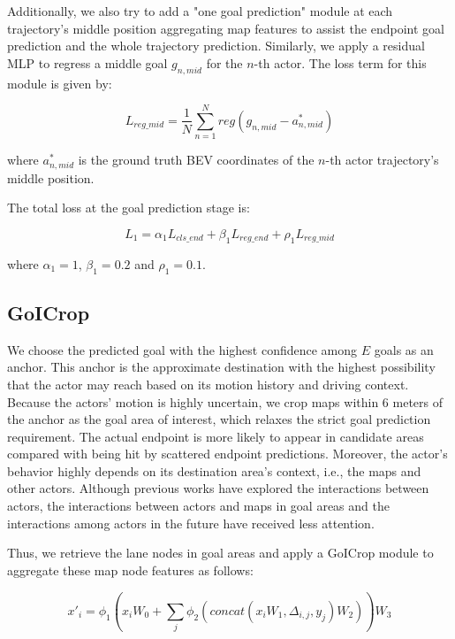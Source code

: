Additionally, we also try to add a "one goal prediction" module at each trajectory's middle position aggregating map features to assist the endpoint goal prediction and the whole trajectory prediction.
Similarly, we apply a residual MLP to regress a middle goal $g_{n,mid}$ for the $n$-th actor. 
The loss term for this module is given by:

\begin{equation}
	L_{reg\_mid} = \frac{1}{N}\sum_{n=1}^N {reg(g_{n,mid}-a^*_{n,mid})}
\end{equation}

where $a^*_{n,mid}$ is the ground truth BEV coordinates of the $n$-th actor trajectory's middle position.

The total loss at the goal prediction stage is:

\begin{equation}
	L_{1} = \alpha_1 L_{cls\_end} + \beta_1 L_{reg\_end} +\rho_1 L_{reg\_mid}
\end{equation}

where $\alpha_1 = 1$, $\beta_1 = 0.2$ and $\rho_1 = 0.1$.

\subsection{GoICrop}

We choose the predicted goal with the highest confidence among $E$ goals as an anchor. This anchor is the approximate destination with the highest possibility that the actor may reach based on its motion history and driving context.
Because the actors' motion is highly uncertain, we crop maps within 6 meters of the anchor as the goal area of interest, which relaxes the strict goal prediction requirement. The actual endpoint is more likely to appear in candidate areas compared with being hit by scattered endpoint predictions.
Moreover, the actor's behavior highly depends on its destination area's context, i.e., the maps and other actors. Although previous works have explored the interactions between actors, the interactions between actors and maps in goal areas and the interactions among actors in the future have received less attention. 

Thus, we retrieve the lane nodes in goal areas and apply a GoICrop module to aggregate these map node features as follows:

\begin{equation}
	x'_i = \phi_1(x_iW_0+\sum_j\phi_2(concat(x_iW_1,\Delta_{i,j},y_j)W_2))W_3
	\label{att}
\end{equation}

